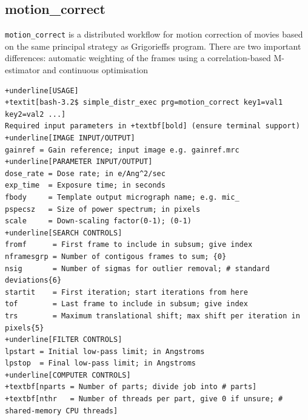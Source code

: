 \documentclass[a4paper,11pt]{article}
\newcommand{\prgname}[1]{\textcolor{NavyBlue}{\texttt{#1}}}
\begin{document}
\subsection{motion\_correct}
\label{motion_correct}
\prgname{motion\_correct} is a distributed workflow for motion correction of movies based on the same principal strategy as Grigorieffs program. There are two important differences: automatic weighting of the frames using a correlation-based M-estimator and continuous optimisation
\begin{Verbatim}[commandchars=+\[\],fontsize=\small,breaklines=true]
+underline[USAGE]
+textit[bash-3.2$ simple_distr_exec prg=motion_correct key1=val1 key2=val2 ...]
Required input parameters in +textbf[bold] (ensure terminal support)
+underline[IMAGE INPUT/OUTPUT]
gainref = Gain reference; input image e.g. gainref.mrc
+underline[PARAMETER INPUT/OUTPUT]
dose_rate = Dose rate; in e/Ang^2/sec
exp_time  = Exposure time; in seconds
fbody     = Template output micrograph name; e.g. mic_
pspecsz   = Size of power spectrum; in pixels
scale     = Down-scaling factor(0-1); (0-1)
+underline[SEARCH CONTROLS]
fromf      = First frame to include in subsum; give index
nframesgrp = Number of contigous frames to sum; {0}
nsig       = Number of sigmas for outlier removal; # standard deviations{6}
startit    = First iteration; start iterations from here
tof        = Last frame to include in subsum; give index
trs        = Maximum translational shift; max shift per iteration in pixels{5}
+underline[FILTER CONTROLS]
lpstart = Initial low-pass limit; in Angstroms
lpstop  = Final low-pass limit; in Angstroms
+underline[COMPUTER CONTROLS]
+textbf[nparts = Number of parts; divide job into # parts]
+textbf[nthr   = Number of threads per part, give 0 if unsure; # shared-memory CPU threads]
\end{Verbatim}
\end{document}

